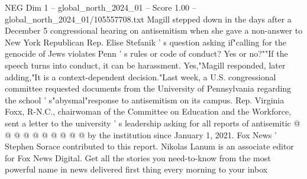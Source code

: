 \begin{textsample}{NEG Dim 1 – global\_north\_2024\_01 – Score 1.00 – global\_north\_2024\_01/105557708.txt}
Magill stepped down in the days after a December 5 congressional hearing on antisemitism when she gave a non-answer to New York Republican Rep.
Elise Stefanik ' s question asking if"calling for the genocide of Jews violates Penn ' s rules or code of conduct?
Yes or no?""If the speech turns into conduct, it can be harassment.
Yes,"Magill responded, later adding,"It is a context-dependent decision."Last week, a U.S. congressional committee requested documents from the University of Pennsylvania regarding the school ' s"abysmal"response to antisemitism on its campus.
Rep.
Virginia Foxx, R-N.C., chairwoman of the Committee on Education and the Workforce, sent a letter to the university ' s leadership asking for all reports of antisemitic @ @ @ @ @ @ @ @ @ @ by the institution since January 1, 2021.
Fox News ' Stephen Sorace contributed to this report.
Nikolas Lanum is an associate editor for Fox News Digital.
Get all the stories you need-to-know from the most powerful name in news delivered first thing every morning to your inbox

\end{textsample}

